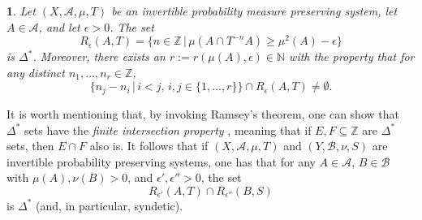 \documentclass[11pt,american,preprint]{elsarticle}
\numberwithin{equation}{section}
\theoremstyle{plain}
\newtheorem{thm}{\protect\theoremname}[section]
\theoremstyle{plain*}
\theoremstyle{plain}
\theoremstyle{plain*}
\theoremstyle{plain}
\theoremstyle{plain*}
\theoremstyle{remark}
\theoremstyle{remark*}
\theoremstyle{remark}
\theoremstyle{remark*}
\theoremstyle{remark}
\theoremstyle{remark*}
\theoremstyle{plain}
\theoremstyle{definition}
\theoremstyle{plain}
\theoremstyle{plain} %
\providecommand{\theoremname}{Theorem}
\newcommand{\N}{\mathbb{N}}
\newcommand{\Z}{\mathbb{Z}}
\begin{document}
\begin{thm}\label{0.Delta*Statement}
    Let $(X,\mathcal A,\mu,T)$ be an invertible probability measure preserving system, let $A\in\mathcal A$, and let $\epsilon>0$. The set 
    $$R_\epsilon(A,T)=\{n\in\Z\,|\,\mu(A\cap T^{-n}A)\geq \mu^2(A)-\epsilon\}$$
    is $\Delta^*$. 
    Moreover, there exists an $r:=
r(\mu(A),\epsilon)\in\N$ with the property that for any distinct $n_1,...,n_r\in\Z$, 
\begin{equation}\label{0.eq:Delta_r*property}
\{n_j-n_i\,|\,i<j,\,i,j\in\{1,...,r\}\}\cap R_\epsilon(A,T)\neq \emptyset.
\end{equation}
\end{thm}
It is worth mentioning that, by invoking Ramsey's theorem, one can show that $\Delta^*$ sets have the \textit{finite intersection property} \cite[p. 179]{Fbook}, meaning that if $E,F\subseteq \Z$ are $\Delta^*$ sets, then $E\cap F$ also is. It follows that if $(X,\mathcal A,\mu,T)$ and $(Y,\mathcal B,\nu,S)$ are invertible probability preserving systems, one has that for any $A\in\mathcal A$, $B\in\mathcal B$ with $\mu(A),\nu(B)>0$, and $\epsilon',\epsilon''>0$, the set 
\begin{equation}\label{0.eq:IntersectionOfSingleRec}
R_{\epsilon'}(A,T)\cap R_{\epsilon''}(B,S)
\end{equation}
is $\Delta^*$ (and, in particular, syndetic).\\
\end{document}
